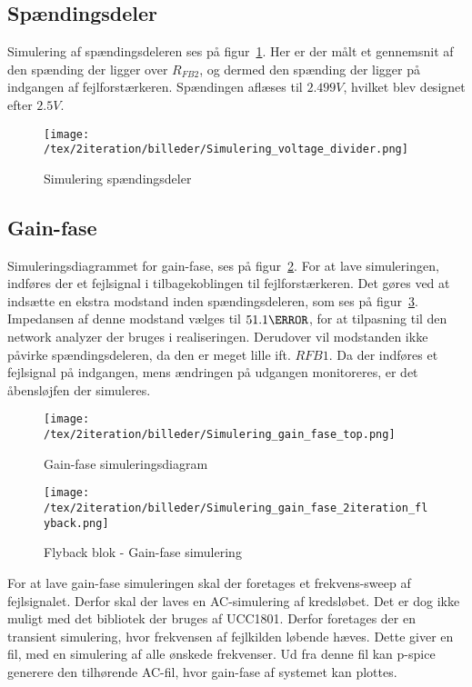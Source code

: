 
\subsection{Spændingsdeler}
Simulering af spændingsdeleren ses på figur~\ref{fig:simulering_voltage_divider}. Her er der målt et gennemsnit af den spænding der ligger over $R_{FB2}$, og dermed den spænding der ligger på indgangen af fejlforstærkeren. Spændingen aflæses til $2.499V$, hvilket blev designet efter $2.5V$.


\begin{figure}[H]
	\center
	\texttt{[image: /tex/2iteration/billeder/Simulering\_voltage\_divider.png]}
	\caption{Simulering spændingsdeler}
	\label{fig:simulering_voltage_divider}
\end{figure}


\subsection{Gain-fase}
Simuleringsdiagrammet for gain-fase, ses på figur~\ref{fig:sim_gain_fase_top}. For at lave simuleringen, indføres der et fejlsignal i tilbagekoblingen til fejlforstærkeren. Det gøres ved at indsætte en ekstra modstand inden spændingsdeleren, som ses på figur~\ref{fig:sim_gain_fase_2iteration}. Impedansen af denne modstand vælges til $51.1\ohm$, for at tilpasning til den network analyzer der bruges i realiseringen. Derudover vil modstanden ikke påvirke spændingsdeleren, da den er meget lille ift. $RFB1$. Da der indføres et fejlsignal på indgangen, mens ændringen på udgangen monitoreres, er det åbensløjfen der simuleres. 

\begin{figure}[H]
	\center
	\texttt{[image: /tex/2iteration/billeder/Simulering\_gain\_fase\_top.png]}
	\caption{Gain-fase simuleringsdiagram}
	\label{fig:sim_gain_fase_top}
\end{figure}

\begin{figure}[H]
	\center
	\texttt{[image: /tex/2iteration/billeder/Simulering\_gain\_fase\_2iteration\_flyback.png]}
	\caption{Flyback blok - Gain-fase simulering}
	\label{fig:sim_gain_fase_2iteration}
\end{figure}

For at lave gain-fase simuleringen skal der foretages et frekvens-sweep af fejlsignalet. Derfor skal der laves en AC-simulering af kredsløbet. Det er dog ikke muligt med det bibliotek der bruges af UCC1801. Derfor foretages der en transient simulering, hvor frekvensen af fejlkilden løbende hæves. Dette giver en fil, med en simulering af alle ønskede frekvenser. Ud fra denne fil kan p-spice generere den tilhørende AC-fil, hvor gain-fase af systemet kan plottes. 


